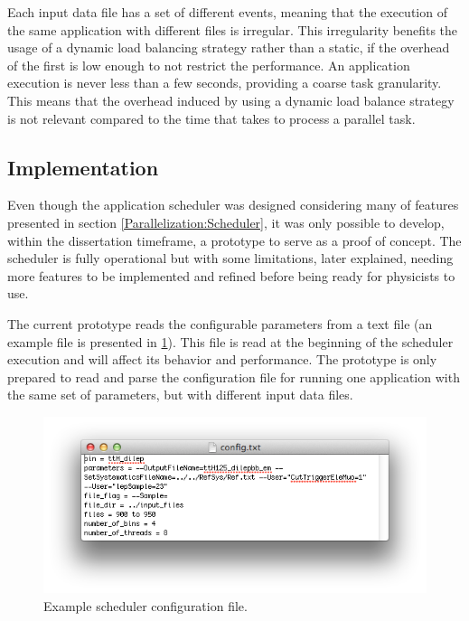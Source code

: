 Each input data file has a set of different events, meaning that the execution of the same application with different files is irregular. This irregularity benefits the usage of a dynamic load balancing strategy rather than a static, if the overhead of the first is low enough to not restrict the performance. An application execution is never less than a few seconds, providing a coarse task granularity. This means that the overhead induced by using a dynamic load balance strategy is not relevant compared to the time that takes to process a parallel task.

\subsection{Implementation}
\label{SchedulerImplementation}

Even though the application scheduler was designed considering many of features presented in section \ref{Parallelization:Scheduler}, it was only possible to develop, within the dissertation timeframe, a prototype to serve as a proof of concept. The scheduler is fully operational but with some limitations, later explained, needing more features to be implemented and refined before being ready for physicists to use.

The current prototype reads the configurable parameters from a text file (an example file is presented in \ref{fig:SchedulerFile}). This file is read at the beginning of the scheduler execution and will affect its behavior and performance. The prototype is only prepared to read and parse the configuration file for running one application with the same set of parameters, but with different input data files.

\begin{figure}[!htp]
	\begin{center}
		\includegraphics[scale=0.8]{../../common/img/scheduler_config.png}
		\caption{Example scheduler configuration file.}
		\label{fig:SchedulerFile}
	\end{center}
\end{figure}

